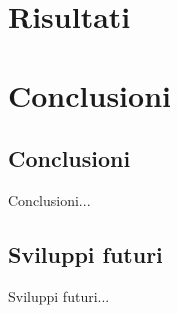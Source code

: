 \documentclass[12pt,italian]{report}
\begin{document}
% 
% 

\chapter{Risultati} \label{chap:risultati}


% 
% 

\chapter{Conclusioni} \label{chap:conclusioni}

\section{Conclusioni}

Conclusioni...

\section{Sviluppi futuri}

Sviluppi futuri...



%
%



\end{document}
